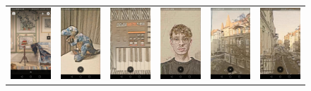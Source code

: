 \documentclass[../Main.tex]{subfiles}
\begin{document}
\begin{figure}[H]
\begin{tabular}{cccccc}
\includegraphics[width = 0.13\linewidth]{Images/app_photos/filters/salon.jpg} &
\includegraphics[width = 0.13\linewidth]{Images/app_photos/dino/salon.jpg} &
\includegraphics[width = 0.13\linewidth]{Images/app_photos/akai/salon.jpg} &
\includegraphics[width = 0.13\linewidth]{Images/app_photos/me/salon.jpg} &
\includegraphics[width = 0.13\linewidth]{Images/app_photos/kamienica/salon.jpg} &
\includegraphics[width = 0.13\linewidth]{Images/app_photos/ulica/salon.jpg} \\


\end{tabular}
\end{figure}
\end{document}
